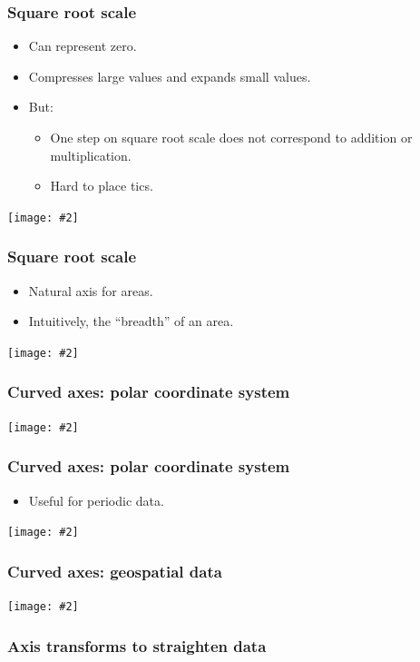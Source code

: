\documentclass{beamer}
\newcommand{\bi}{\begin{itemize}}
\newcommand{\li}{\item}
\newcommand{\ei}{\end{itemize}}
\newcommand{\fig}[2]{\centerline{\texttt{[image: \#2]}}}
\newcommand{\bfr}[1]{\begin{frame}[fragile]\frametitle{{ #1 }}}
\begin{document}
\bfr{Square root scale}
\bi
\li Can represent zero.
\li Compresses large values and expands small values.
\li But:\bi
\li One step on square root scale does not correspond to addition or multiplication.
\li Hard to place tics. 
\ei
\ei
\fig{.7}{sqrt-scales-1.png}
\end{frame}

\bfr{Square root scale}
\bi
\li Natural axis for areas.
\li Intuitively, the ``breadth'' of an area.
\ei
\fig{1}{northeast-state-areas-1.png}
\end{frame}

\bfr{Curved axes: polar coordinate system}
\fig{1}{polar-coord-1.png}
\end{frame}

\bfr{Curved axes: polar coordinate system}
\bi
\li Useful for periodic data.
\ei
\fig{1}{temperature-normals-polar-1.png}
\end{frame}

\bfr{Curved axes: geospatial data}

\fig{1}{worldmap-four-projections-1.png}
\end{frame}


\bfr{Axis transforms to straighten data}
\end{frame}
\end{document}
